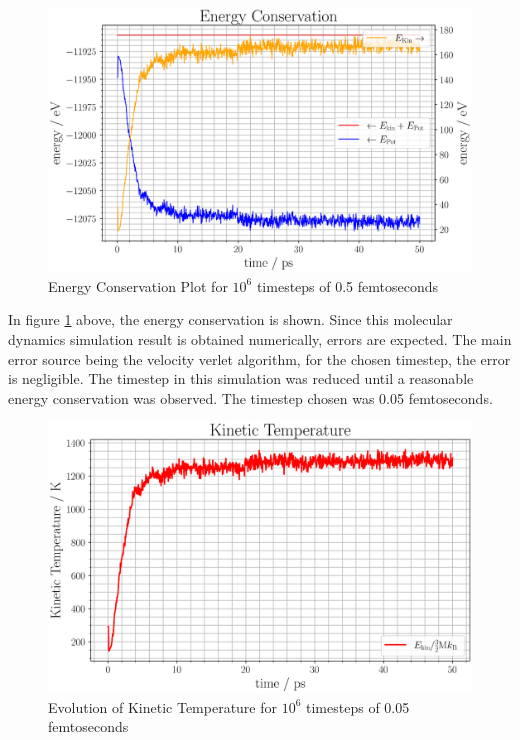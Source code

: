 \pagebreak

\begin{figure}[ht]
    \centering
    \includegraphics[width=1\textwidth]{figures/energy_conservation.eps}
	\caption{Energy Conservation Plot for $10^6$ timesteps of 0.5 femtoseconds}
	\label{energy_conservation_plot}
\end{figure}

In figure \ref{energy_conservation_plot} above, the energy conservation is shown. Since this molecular dynamics simulation result is obtained numerically,
errors are expected. The main error source being the velocity verlet algorithm, for the chosen timestep, the error is negligible. 
The timestep in this simulation was reduced until a reasonable energy conservation was observed. The timestep chosen was 0.05 femtoseconds. 

\pagebreak

\begin{figure}[ht]
    \centering
    \includegraphics[width=1\textwidth]{figures/kin_temp.eps}
	\caption{Evolution of Kinetic Temperature for $10^6$ timesteps of 0.05 femtoseconds}
	\label{kin_temp_plot}
\end{figure}

